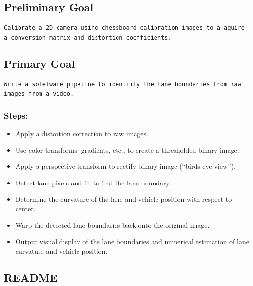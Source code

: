 \documentclass[11pt]{article}
\providecommand{\tightlist}{%
      \setlength{\itemsep}{0pt}\setlength{\parskip}{0pt}}
\begin{document}
    \hypertarget{preliminary-goal}{%
\subsection{Preliminary Goal}\label{preliminary-goal}}

\begin{verbatim}
Calibrate a 2D camera using chessboard calibration images to a aquire a conversion matrix and distortion coefficients.   
\end{verbatim}

\hypertarget{primary-goal}{%
\subsection{Primary Goal}\label{primary-goal}}

\begin{verbatim}
Write a sofetware pipeline to identiify the lane boundaries from raw images from a video.
\end{verbatim}

\hypertarget{steps}{%
\subsubsection{Steps:}\label{steps}}

\begin{itemize}
\tightlist
\item
  Apply a distortion correction to raw images.
\item
  Use color transforms, gradients, etc., to create a thresholded binary
  image.
\item
  Apply a perspective transform to rectify binary image (``birds-eye
  view'').
\item
  Detect lane pixels and fit to find the lane boundary.
\item
  Determine the curvature of the lane and vehicle position with respect
  to center.
\item
  Warp the detected lane boundaries back onto the original image.
\item
  Output visual display of the lane boundaries and numerical estimation
  of lane curvature and vehicle position.
\end{itemize}

    \hypertarget{readme}{%
\subsection{README}\label{readme}}
\end{document}
